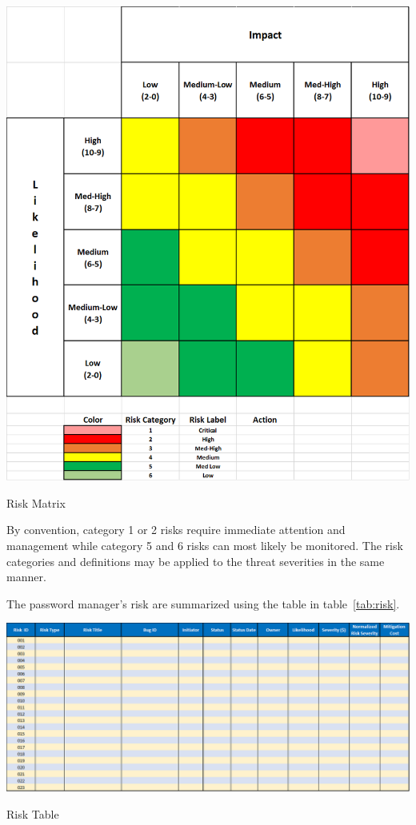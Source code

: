 \documentclass{tufte-book}
\begin{document}
\begin{marginfigure}%
    \centering
    \includegraphics[width=0.7\linewidth]{risk_matrix_2017-02-03_15-23-28.png}
    \caption{Risk Matrix}
    \label{fig:riskmatrix}
\end{marginfigure}

By convention, category 1 or 2 risks require immediate attention and management while category 5 and 6 risks can most likely be monitored.  The risk categories and definitions may be applied to the threat severities in the same manner.

The password manager's risk are summarized using the table in table~\ref{tab:risk}.
\begin{table}[h]
    \centering
    \includegraphics[width=\linewidth]{risk_table_2017-02-03_14-11-08.png}
    \caption{Risk Table}
    \label{tab:risk}
\end{table}






\end{document}
